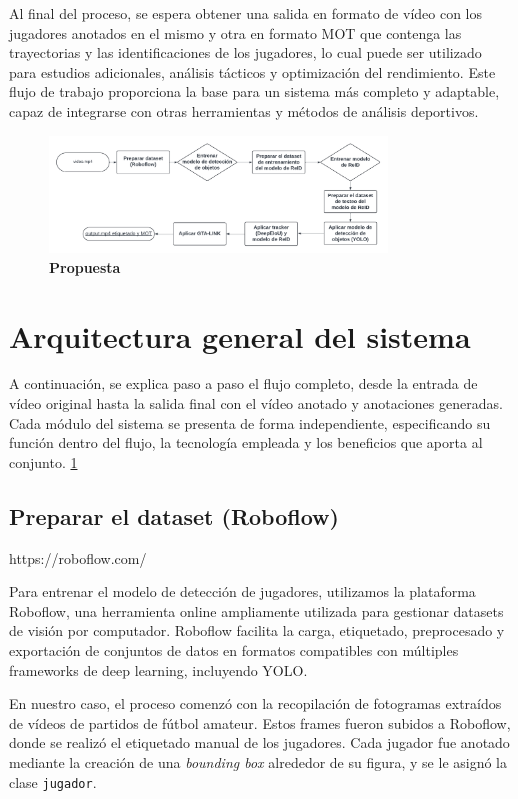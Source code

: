 \documentclass[12pt, a4paper, twoside]{article}
\begin{document}
	Al final del proceso, se espera obtener una salida en formato de vídeo con los jugadores anotados en el mismo y otra en formato MOT que contenga las trayectorias y las identificaciones de los jugadores, lo cual puede ser utilizado para estudios adicionales, análisis tácticos y optimización del rendimiento. Este flujo de trabajo proporciona la base para un sistema más completo y adaptable, capaz de integrarse con otras herramientas y métodos de análisis deportivos.
	
	\begin{figure}[H]
		\centering
		\includegraphics[width=0.8\textwidth]{image/Flowcharts}
		\caption{\textbf{Propuesta}}
		\label{fig:Propuesta}
	\end{figure}
	
	
	\section{Arquitectura general del sistema}
	
	A continuación, se explica paso a paso el flujo completo, desde la entrada de vídeo original hasta la salida final con el vídeo anotado y anotaciones generadas. Cada módulo del sistema se presenta de forma independiente, especificando su función dentro del flujo, la tecnología empleada y los beneficios que aporta al conjunto. \ref{fig:Propuesta}
	
	
	\subsection{Preparar el dataset (Roboflow)}
	
	https://roboflow.com/
	
	Para entrenar el modelo de detección de jugadores, utilizamos la plataforma Roboflow, una herramienta online ampliamente utilizada para gestionar datasets de visión por computador. Roboflow facilita la carga, etiquetado, preprocesado y exportación de conjuntos de datos en formatos compatibles con múltiples frameworks de deep learning, incluyendo YOLO.
	
	En nuestro caso, el proceso comenzó con la recopilación de fotogramas extraídos de vídeos de partidos de fútbol amateur. Estos frames fueron subidos a Roboflow, donde se realizó el etiquetado manual de los jugadores. Cada jugador fue anotado mediante la creación de una \textit{bounding box} alrededor de su figura, y se le asignó la clase \texttt{jugador}.
	
\end{document}

